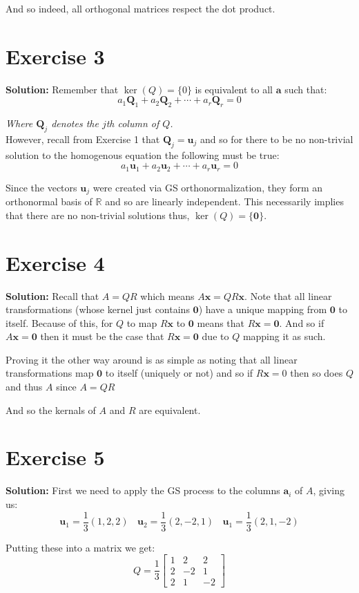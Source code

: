 \documentclass{article}
\newcommand{\R}{\mathbb R}
\newcommand{\mbf}[1]{\mathbf #1}
\begin{document}
And so indeed, all orthogonal matrices respect the dot product.

\section*{Exercise 3}
\textbf{Solution:} Remember that $\operatorname{ker}(Q)=\{0\}$ is equivalent to all $\mbf a$ such that:
$$a_1\mbf Q_1+a_2\mbf Q_2+\cdots+a_r\mbf Q_r=0$$

\textit{Where $\mbf Q_j$ denotes the $j$th column of $Q$.}
\\

However, recall from Exercise 1 that $\mbf Q_j=\mbf u_j$ and so for there to be no non-trivial solution to the homogenous equation the following must be true:
$$a_1\mbf u_1+a_2\mbf u_2+\cdots+a_r\mbf u_r=0$$

Since the vectors $\mbf u_j$ were created via GS orthonormalization, they form an orthonormal basis of $\R$ and so are linearly independent. This necessarily implies that there are no non-trivial solutions thus, $\operatorname{ker}(Q)=\{\mbf 0\}$.

\section*{Exercise 4}
\textbf{Solution:} Recall that $A=QR$ which means $A\mbf x=QR\mbf x$. Note that all linear transformations (whose kernel just contains $\mbf 0$) have a unique mapping from $\mbf 0$ to itself. Because of this, for $Q$ to map $R\mbf x$ to $\mbf 0$ means that $R\mbf x=\mbf 0$. And so if $A\mbf x=\mbf 0$ then it must be the case that $R\mbf x=\mbf 0$ due to $Q$ mapping it as such.

Proving it the other way around is as simple as noting that all linear transformations map $\mbf 0$ to itself (uniquely or not) and so if $R\mbf x=0$ then so does $Q$ and thus $A$ since $A=QR$

And so the kernals of $A$ and $R$ are equivalent.
\section*{Exercise 5}
\textbf{Solution:} First we need to apply the GS process to the columns $\mbf a_i$ of $A$, giving us:
$$\mbf u_1=\frac{1}{3}(1,2,2)\ \ \ \  \mbf u_2=\frac{1}{3}(2,-2,1)\ \ \ \ \mbf u_1=\frac{1}{3}(2,1,-2)$$

Putting these into a matrix we get:
$$Q=\frac{1}{3}\begin{bmatrix}
    1 & 2 & 2\\
    2 & -2 & 1\\
    2 & 1 & -2
\end{bmatrix}$$
\end{document}
